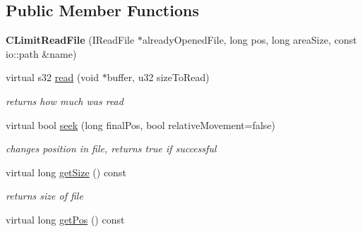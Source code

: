 \subsection*{Public Member Functions}
\begin{DoxyCompactItemize}
\item 
\hypertarget{classirr_1_1io_1_1_c_limit_read_file_a520e5ed01f7c6ae5a7f86a1c58b39c3e}{{\bfseries C\-Limit\-Read\-File} (I\-Read\-File $\ast$already\-Opened\-File, long pos, long area\-Size, const io\-::path \&name)}\label{classirr_1_1io_1_1_c_limit_read_file_a520e5ed01f7c6ae5a7f86a1c58b39c3e}

\item 
\hypertarget{classirr_1_1io_1_1_c_limit_read_file_afe2774eae9e38f116981b2f869450de4}{virtual s32 \hyperlink{classirr_1_1io_1_1_c_limit_read_file_afe2774eae9e38f116981b2f869450de4}{read} (void $\ast$buffer, u32 size\-To\-Read)}\label{classirr_1_1io_1_1_c_limit_read_file_afe2774eae9e38f116981b2f869450de4}

\begin{DoxyCompactList}\small\item\em returns how much was read \end{DoxyCompactList}\item 
virtual bool \hyperlink{classirr_1_1io_1_1_c_limit_read_file_a83b88015cd34726dc1751a4d3e795c12}{seek} (long final\-Pos, bool relative\-Movement=false)
\begin{DoxyCompactList}\small\item\em changes position in file, returns true if successful \end{DoxyCompactList}\item 
\hypertarget{classirr_1_1io_1_1_c_limit_read_file_aca7a8c3455013d9cc50e807de6cacd59}{virtual long \hyperlink{classirr_1_1io_1_1_c_limit_read_file_aca7a8c3455013d9cc50e807de6cacd59}{get\-Size} () const }\label{classirr_1_1io_1_1_c_limit_read_file_aca7a8c3455013d9cc50e807de6cacd59}

\begin{DoxyCompactList}\small\item\em returns size of file \end{DoxyCompactList}\item 
\hypertarget{classirr_1_1io_1_1_c_limit_read_file_ad901a3b2068808d9708059d46631df6d}{virtual long \hyperlink{classirr_1_1io_1_1_c_limit_read_file_ad901a3b2068808d9708059d46631df6d}{get\-Pos} () const }\label{classirr_1_1io_1_1_c_limit_read_file_ad901a3b2068808d9708059d46631df6d}


\end{DoxyCompactItemize}
